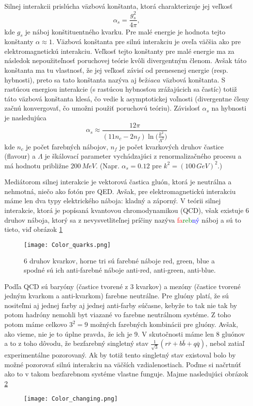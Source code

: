 \documentclass[../../main.tex]{subfiles}
\begin{document}
Silnej interakcii prislúcha väzbová konštanta, ktorá charakterizuje jej veľkosť
$$
\alpha_s= \frac{g_s^2}{4\pi},
$$
kde $g_s$ je náboj konštituentného kvarku. Pre malé energie je hodnota tejto konštanty $\alpha\approx 1$. Väzbová konštanta pre silnú interakciu je oveľa väčšia ako pre elektromagnetickú interakciu. Veľkosť tejto konštanty pre malé energie ma za následok nepoužiteľnosť poruchovej teórie kvôli divergentným členom. Avšak táto konštanta ma tu vlastnosť, že jej veľkosť závisí od prenesenej energie (resp. hybnosti), preto sa tato konštanta nazýva aj $bežiaca$ väzbová konštanta. S rastúcou energiou interakcie (s rastúcou hybnosťou zrážajúcich sa častíc) totiž táto väzbová konštanta klesá, čo vedie k asymptotickej voľnosti (divergentne členy začnú konvergovať, čo umožni použiť poruchovú teóriu). Závislosť $\alpha_s$ na hybnosti je nasledujúca
$$
\alpha_s\approx\frac{12\pi}{(11n_c-2n_f)\ln\big(\frac{k^2}{\Lambda^2}\big)}
$$ 
kde $n_c$ je počet farebných nábojov, $n_f$ je počet kvarkových druhov častice (flavour) a $\Lambda$ je škálovací parameter vychádzajúci z renormalizačného procesu a má hodnotu približne $200\,MeV$. (Napr. $\alpha_s=0.12$ pre $k^2=(100\,GeV)^2$.)

Mediátorom silnej interakcie je vektorová častica gluón, ktorá je neutrálna a nehmotná, niečo ako fotón pre QED. Avšak, pre elektromagnetickú interakciu máme len dva typy elektrického náboja: kladný a záporný. V teórii silnej interakcie, ktorá je popísaná kvantovou chromodynamikou (QCD), však existuje 6 druhov náboja, ktorý sa z nevysvetliteľnej príčiny nazýva \textcolor{red}{fa}\textcolor{green}{reb}\textcolor{blue}{ný} náboj a sú to tieto, viď obrázok \ref{sf1:fig:Color_quarks}
\begin{figure}[!h]
\centering
\texttt{[image: Color\_quarks.png]}
\caption{6 druhov kvarkov, horne tri sú farebné náboje red, green, blue a spodné sú ich anti-farebné náboje anti-red, anti-green, anti-blue.}
\label{sf1:fig:Color_quarks}
\end{figure}
\newline
Podľa QCD sú baryóny (častice tvorené z 3 kvarkov) a mezóny (častice tvorené jedným kvarkom a anti-kvarkom) farebne neutrálne. Pre gluóny platí, že sú nositeľmi aj jednej farby aj jednej anti-farby súčasne, kebyže to tak nie tak by potom hadróny nemohli byt viazané vo farebne neutrálnom systéme.  Z toho potom máme celkovo $3^2=9$ možných farebných kombinácii pre gluóny. Avšak, ako vieme, nie je to úplne pravda, že ich je 9. V skutočnosti máme len 8 gluónov a to z toho dôvodu, že bezfarebný singletný stav $\frac{1}{\sqrt{3}}(r\bar{r}+b\bar{b}+q\bar{q})$, nebol zatiaľ experimentálne pozorovaný. Ak by totiž tento singletný stav existoval bolo by možné pozorovať silnú interakciu na väčších vzdialenostiach. Poďme si načrtnúť ako to v takom bezfarebnom systéme vlastne funguje. Majme nasledujúci obrázok \ref{sf1:fig:Prechody}
\begin{figure}[!h]
\centering
\texttt{[image: Color\_changing.png]}
\caption{}
\label{sf1:fig:Prechody}
\end{figure}
\newline
\end{document}
